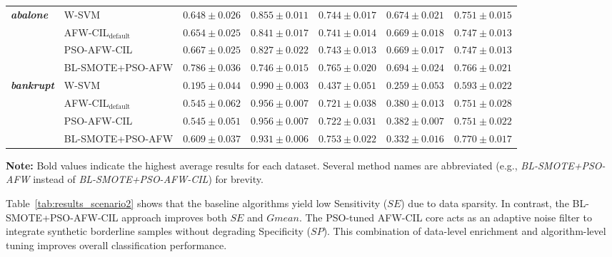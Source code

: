 \documentclass[pdflatex,sn-mathphys-num]{sn-jnl}%
\theoremstyle{thmstyleone}%
\theoremstyle{thmstyletwo}
\theoremstyle{thmstylethree}
\begin{document}
\begin{table}[htbp]
{\begin{tabular}{llccccc}
\midrule
\multirow{4}{*}{\textbf{\textit{abalone}}}
& W-SVM & $0.648 \pm 0.026$ & $\mathbf{0.855 \pm 0.011}$ & $0.744 \pm 0.017$ & $0.674 \pm 0.021$ & $0.751 \pm 0.015$ \\
& AFW-CIL$_{\mathrm{default}}$ & $0.654 \pm 0.025$ & $0.841 \pm 0.017$ & $0.741 \pm 0.014$ & $0.669 \pm 0.018$ & $0.747 \pm 0.013$ \\
& PSO-AFW-CIL & $0.667 \pm 0.025$ & $0.827 \pm 0.022$ & $0.743 \pm 0.013$ & $0.669 \pm 0.017$ & $0.747 \pm 0.013$ \\
& BL-SMOTE+PSO-AFW & $\mathbf{0.786 \pm 0.036}$ & $0.746 \pm 0.015$ & $\mathbf{0.765 \pm 0.020}$ & $\mathbf{0.694 \pm 0.024}$ & $\mathbf{0.766 \pm 0.021}$ \\
\midrule
\multirow{4}{*}{\textbf{\textit{bankrupt}}}
& W-SVM & $0.195 \pm 0.044$ & $\mathbf{0.990 \pm 0.003}$ & $0.437 \pm 0.051$ & $0.259 \pm 0.053$ & $0.593 \pm 0.022$ \\
& AFW-CIL$_{\mathrm{default}}$ & $0.545 \pm 0.062$ & $0.956 \pm 0.007$ & $0.721 \pm 0.038$ & $0.380 \pm 0.013$ & $0.751 \pm 0.028$ \\
& PSO-AFW-CIL & $0.545 \pm 0.051$ & $0.956 \pm 0.007$ & $0.722 \pm 0.031$ & $\mathbf{0.382 \pm 0.007}$ & $0.751 \pm 0.022$ \\
& BL-SMOTE+PSO-AFW & $\mathbf{0.609 \pm 0.037}$ & $0.931 \pm 0.006$ & $\mathbf{0.753 \pm 0.022}$ & $0.332 \pm 0.016$ & $\mathbf{0.770 \pm 0.017}$ \\
\bottomrule
\end{tabular}
}

\smallskip
\noindent \footnotesize \textbf{Note:} Bold values indicate the highest average results for each dataset. Several method names are abbreviated (e.g., \textit{BL-SMOTE+PSO-AFW} instead of \textit{BL-SMOTE+PSO-AFW-CIL}) for brevity.
\end{table}

\smallskip
Table~\ref{tab:results_scenario2} shows that the baseline algorithms yield low Sensitivity ($SE$) due to data sparsity. In contrast, the BL-SMOTE+PSO-AFW-CIL approach improves both $SE$ and $Gmean$. The PSO-tuned AFW-CIL core acts as an adaptive noise filter to integrate synthetic borderline samples without degrading Specificity ($SP$). This combination of data-level enrichment and algorithm-level tuning improves overall classification performance.
\end{document}
